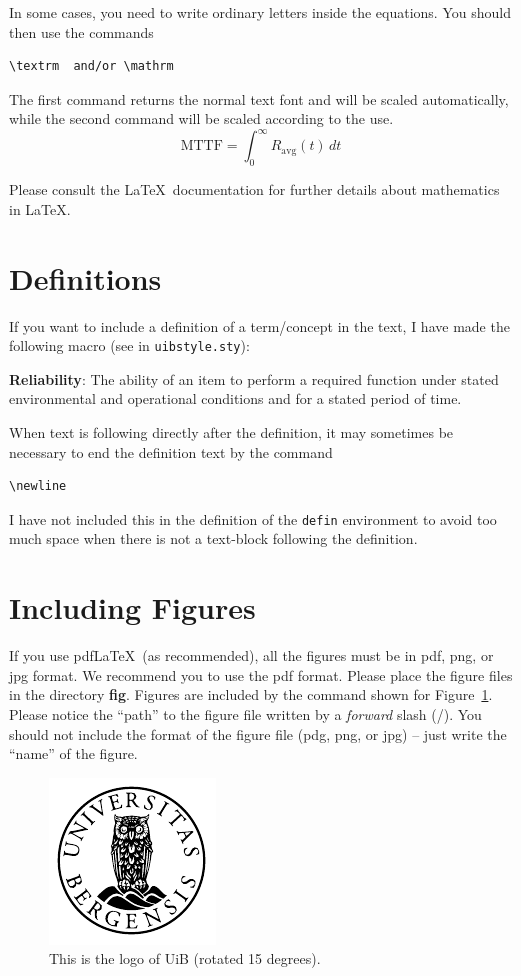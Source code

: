 \documentclass[../Main/thesis.tex]{subfiles}
\begin{document}
In some cases, you need to write ordinary letters inside the equations. 
You should then use the commands 
\begin{verbatim}
\textrm  and/or \mathrm
\end{verbatim}
The first command returns the normal text font and will be scaled automatically, while the second command will be scaled according to the use.
\begin{equation*}
\textrm{MTTF}= \int_0^\infty R_\mathrm{avg}(t)\,dt
\end{equation*}



Please consult the \LaTeX\ documentation for further details about mathematics in \LaTeX.
\section*{Definitions}
\label{sec:definitions}
If you want to include a definition of a term/concept in the text, I have made the following macro (see in \texttt{uibstyle.sty}):
\begin{defin}
\textbf{Reliability}: The ability of an item to perform a required function under stated environmental and operational conditions and for a stated period of time.\newline
\end{defin}
When text is following directly after the definition, it may sometimes be necessary to end the definition text by the command
\begin{verbatim}
\newline
\end{verbatim}
I have not included this in the definition of the \texttt{defin} environment to avoid too much space when there is not a text-block following the definition.
\section{Including Figures}
\label{sec:including_figures}
If you use pdf\LaTeX\ (as recommended), all the figures must be in pdf, png, or jpg format. 
We recommend you to use the pdf format.  
Please place the figure files in the directory \textbf{fig}. 
Figures are included by the command shown for Figure~\ref{fig:uib_logo_rotated}. 
Please notice the ``path'' to the figure file written by a \emph{forward} slash (/). 
You should not include the format of the figure file (pdg, png, or jpg) -- just write the ``name'' of the figure. 
\begin{figure}
\centering
\includegraphics[scale=0.6,angle=15]{../fig/uib}
\caption{This is the logo of UiB (rotated 15 degrees).}
\label{fig:uib_logo_rotated}
\end{figure}
\end{document}
